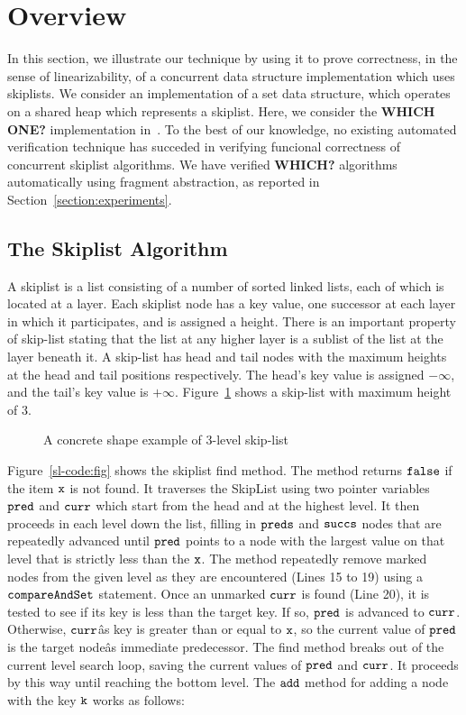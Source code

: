 \section{Overview}
\label{sec:overview}

  In this section, we illustrate our technique by using it to prove correctness, in
the sense of linearizability, of
a concurrent data structure implementation which uses skiplists.
We consider an implementation of a set data structure, which operates on
a shared heap which represents a skiplist. Here, we consider the
{\bf WHICH ONE?} implementation in~\cite{ArtOfMpP}.
To the best of our knowledge, no existing automated verification technique
has succeded in verifying funcional correctness of concurrent
skiplist algorithms.
We have verified {\bf WHICH?} algorithms automatically using fragment
abstraction, as reported in Section~\ref{section:experiments}.


\subsection{The Skiplist Algorithm}
A skiplist is a list consisting of a number of sorted linked lists, each of which is located at a layer. Each skiplist node has a key value, one successor at each layer in which it participates, and is assigned a height. There is an important property of skip-list stating that the list at any higher layer is a sublist of the list at the layer beneath it. A skip-list has head and tail nodes with the maximum heights at the head and tail positions respectively. The head’s key value is assigned $-\infty$, and the tail’s key value is $+\infty$. Figure~\ref{sl} shows a skip-list with maximum height of 3.
\begin{figure}
\center  
 
  \caption{A concrete shape example of 3-level skip-list}
\label{sl}
\end{figure}



Figure~\ref{sl-code:fig} shows the skiplist find method. The method returns $\tt false$ if the item  $\tt x$ is not found. It traverses the SkipList using two pointer variables $\tt pred$ and $\tt curr$ which start from the head and at the highest level. It then proceeds in each level down the list, filling in $\tt preds$
and $\tt succs$ nodes that are repeatedly advanced until $\tt pred$ points to a node with
the largest value on that level that is strictly less than the $\tt x$. The method repeatedly remove marked nodes from the
given level as they are encountered (Lines 15 to 19) using a $\tt compareAndSet$ statement. Once an unmarked $\tt curr$ is found (Line 20), it is
tested to see if its key is less than the target key. If so, $\tt pred$ is advanced to $\tt curr$. Otherwise, $\tt curr$âs key is greater than or equal to $\tt x$, so the current value
of $\tt pred$ is the target nodeâs immediate predecessor. The find method breaks
out of the current level search loop, saving the current values of $\tt pred$ and $\tt curr$. It proceeds by this way until reaching the bottom level. The $\tt add$ method for adding a node with the key $\tt k$ works as follows: 


